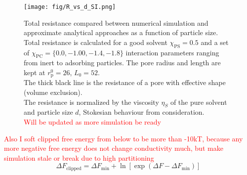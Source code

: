 \documentclass[10pt, a4paper]{article}
\newcommand\todo[1]{\textcolor{red}{#1}}
\begin{document}
\begin{multicols}{2}
\begin{figure}[H]
    \centering
    \texttt{[image: fig/R\_vs\_d\_SI.png]}
    \caption{%
        Total resistance compared between numerical simulation and approximate analytical approaches as a function of particle size.
        Total resistance is calculated for a good solvent $\chi_{\text{PS}} = 0.5$ and a set of 
        $\chi_{\text{PC}} = \{0.0, -1.00, -1.4, -1.8\}$ 
        interaction parameters ranging from inert to adsorbing particles.
        The pore radius and length are kept at $r_{\text{p}}^{0} = 26$, $L_{0} = 52$.
        \\
        The thick black line is the resistance of a pore with effective shape (volume exclusion).
        \\
        The resistance is normalized by the viscosity $\eta_{S}$ of the pure solvent and particle size $d$, Stokesian behaviour from consideration.
        \\
        \todo{Will be updated as more simulation be ready}
        }
    \label{fig:CFD_comparison}
\end{figure}

\todo{Also I soft clipped free energy from below to be more than -10kT, because any more negative free energy does not change conductivity much, but make simulation stale or break due to high partitioning}
\begin{equation}
    \Delta F_{\text{clipped}} = \Delta F_{\text{min}}+ \ln[\exp(\Delta F - \Delta F_{\text{min}})]
\end{equation}

\end{multicols}
    

\end{document}
